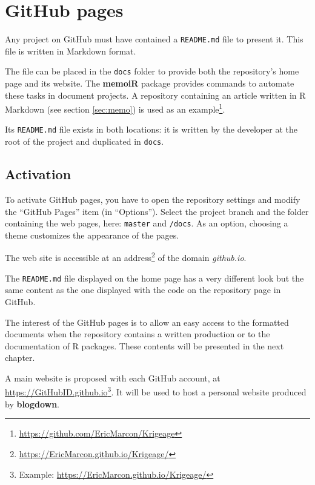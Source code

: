 \documentclass[
  12pt,
  american,
  a4paper,
  extrafontsizes,onecolumn,openright
  ]{memoir}
\begin{document}
\normalsize

\hypertarget{sec:github-pages}{%
\section{GitHub pages}\label{sec:github-pages}}

Any project on GitHub must have contained a \texttt{README.md} file to present it.
This file is written in Markdown format.

The file can be placed in the \texttt{docs} folder to provide both the repository's home page and its website.
The \textbf{memoiR} package provides commands to automate these tasks in document projects.
A repository containing an article written in R Markdown (see section \ref{sec:memo}) is used as an example\footnote{\url{https://github.com/EricMarcon/Krigeage}}.

Its \texttt{README.md} file exists in both locations: it is written by the developer at the root of the project and duplicated in \texttt{docs}.

\hypertarget{activation}{%
\subsection{Activation}\label{activation}}

To activate GitHub pages, you have to open the repository settings and modify the \enquote{GitHub Pages} item (in \enquote{Options}).
Select the project branch and the folder containing the web pages, here: \texttt{master} and \texttt{/docs}.
As an option, choosing a theme customizes the appearance of the pages.

The web site is accessible at an address\footnote{\url{https://EricMarcon.github.io/Krigeage/}} of the domain \emph{github.io}.

The \texttt{README.md} file displayed on the home page has a very different look but the same content as the one displayed with the code on the repository page in GitHub.

The interest of the GitHub pages is to allow an easy access to the formatted documents when the repository contains a written production or to the documentation of R packages.
These contents will be presented in the next chapter.

A main website is proposed with each GitHub account, at \url{https://GitHubID.github.io}\footnote{Example: \url{https://EricMarcon.github.io/Krigeage/}}.
It will be used to host a personal website produced by \textbf{blogdown}.
\end{document}
